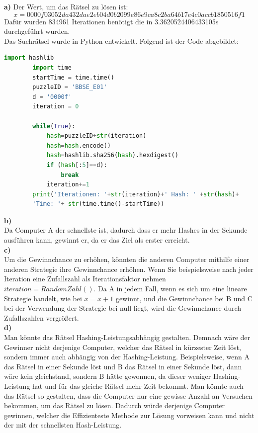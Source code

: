 \documentclass[german]{../uebung}
\begin{document}
\begin{exercise}{4}\textbf{a)}
    Der Wert, um das Rätsel zu lösen ist: \[x=0000f03052da432dae2eb04d0b2099e86e9ca8c2ba64b17e4c0accb1850516f1\] Dafür wurden 834961 Iterationen benötigt die in 3.3620524406433105s durchgeführt wurden.\\
    Das Suchrätsel wurde in Python entwickelt. Folgend ist der Code abgebildet:
    \begin{lstlisting}[language=Python]
        import hashlib 
        import time 
        startTime = time.time() 
        puzzleID = 'BBSE_E01' 
        d = '0000f'
        iteration = 0
        
        while(True):
            hash=puzzleID+str(iteration)
            hash=hash.encode()
            hash=hashlib.sha256(hash).hexdigest()
            if (hash[:5]==d):
                break
            iteration+=1
        print('Iterationen: '+str(iteration)+' Hash: ' +str(hash)+
        'Time: '+ str(time.time()-startTime))
    \end{lstlisting}
    \textbf{b)}\\
    Da Computer A der schnellste ist, dadurch dass er mehr Hashes in der Sekunde ausführen kann, gewinnt er, da er das Ziel als erster erreicht.\\
    \textbf{c)}\\
    Um die Gewinnchance zu erhöhen, könnten die anderen Computer mithilfe einer anderen Strategie ihre Gewinnchance erhöhen. Wenn Sie beispielsweise nach jeder Iteration eine Zufallszahl als Iterationsfaktor nehmen \(iteration=RandomZahl()\). Da A in jedem Fall, wenn es sich um eine lineare Strategie handelt, wie bei \(x=x+1\) gewinnt, und die Gewinnchance bei B und C bei der Verwendung der Strategie bei null liegt, wird die Gewinnchance durch Zufallszahlen vergrößert. \\
    \textbf{d)}\\
    Man könnte das Rätsel Hashing-Leistungsabhängig gestalten. Demnach wäre der Gewinner nicht derjenige Computer, welcher das Rätsel in kürzester Zeit löst, sondern immer auch abhängig von der Hashing-Leistung. Beispielsweise, wenn A das Rätsel in einer Sekunde löst und B das Rätsel in einer Sekunde löst, dann wäre kein gleichstand, sondern B hätte gewonnen, da dieser weniger Hashing-Leistung hat und für das gleiche Rätsel mehr Zeit bekommt.
    Man könnte auch das Rätsel so gestalten, dass die Computer nur eine gewisse Anzahl an Versuchen bekommen, um das Rätsel zu lösen. Dadurch würde derjenige Computer gewinnen, welcher die Effizienteste Methode zur Lösung vorweisen kann und nicht der mit der schnellsten Hash-Leistung.\\
\end{exercise}\\
\end{document}
